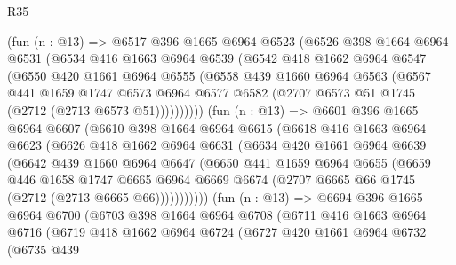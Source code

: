 \begin{lexlean}{R35}
\begin{coremodule}
        (fun (n : @13) =>
        @6517
          @396
          @1665
          @6964
          @6523
          (@6526
            @398
            @1664
            @6964
            @6531
            (@6534
              @416
              @1663
              @6964
              @6539
              (@6542
                @418
                @1662
                @6964
                @6547
                (@6550
                  @420
                  @1661
                  @6964
                  @6555
                  (@6558
                    @439
                    @1660
                    @6964
                    @6563
                    (@6567
                      @441
                      @1659
                      @1747
                      @6573
                      @6964
                      @6577
                      @6582
                      (@2707 @6573 @51 @1745 (@2712 (@2713 @6573 @51))))))))))
        (fun (n : @13) =>
        @6601
          @396
          @1665
          @6964
          @6607
          (@6610
            @398
            @1664
            @6964
            @6615
            (@6618
              @416
              @1663
              @6964
              @6623
              (@6626
                @418
                @1662
                @6964
                @6631
                (@6634
                  @420
                  @1661
                  @6964
                  @6639
                  (@6642
                    @439
                    @1660
                    @6964
                    @6647
                    (@6650
                      @441
                      @1659
                      @6964
                      @6655
                      (@6659
                        @446
                        @1658
                        @1747
                        @6665
                        @6964
                        @6669
                        @6674
                        (@2707 @6665 @66 @1745 (@2712 (@2713 @6665 @66)))))))))))
        (fun (n : @13) =>
        @6694
          @396
          @1665
          @6964
          @6700
          (@6703
            @398
            @1664
            @6964
            @6708
            (@6711
              @416
              @1663
              @6964
              @6716
              (@6719
                @418
                @1662
                @6964
                @6724
                (@6727
                  @420
                  @1661
                  @6964
                  @6732
                  (@6735
                    @439

\end{coremodule}
\end{lexlean}
